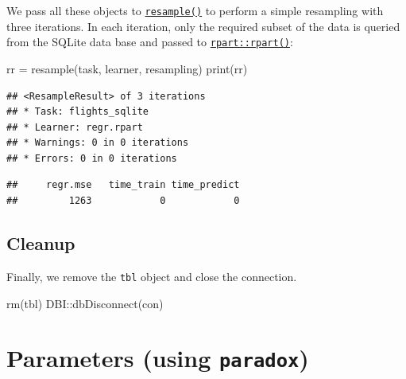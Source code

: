 \documentclass[
]{scrbook}
\newenvironment{Shaded}{\begin{snugshade}}{\end{snugshade}}
\newcommand{\FunctionTok}[1]{\textcolor[rgb]{0.00,0.00,0.00}{#1}}
\newcommand{\NormalTok}[1]{#1}
\newcommand{\OtherTok}[1]{\textcolor[rgb]{0.56,0.35,0.01}{#1}}
\newcommand{\SpecialCharTok}[1]{\textcolor[rgb]{0.00,0.00,0.00}{#1}}
\renewenvironment{Shaded} {\begin{snugshade}\small} {\end{snugshade}}
\begin{document}
We pass all these objects to \href{https://mlr3.mlr-org.com/reference/resample.html}{\texttt{resample()}} to perform a simple resampling with three iterations.
In each iteration, only the required subset of the data is queried from the SQLite data base and passed to \href{https://www.rdocumentation.org/packages/rpart/topics/rpart}{\texttt{rpart::rpart()}}:

\begin{Shaded}
\begin{Highlighting}[]
\NormalTok{rr }\OtherTok{=} \FunctionTok{resample}\NormalTok{(task, learner, resampling)}
\FunctionTok{print}\NormalTok{(rr)}
\end{Highlighting}
\end{Shaded}

\begin{verbatim}
## <ResampleResult> of 3 iterations
## * Task: flights_sqlite
## * Learner: regr.rpart
## * Warnings: 0 in 0 iterations
## * Errors: 0 in 0 iterations
\end{verbatim}

\begin{Shaded}
\end{Shaded}

\begin{verbatim}
##     regr.mse   time_train time_predict 
##         1263            0            0
\end{verbatim}

\hypertarget{cleanup}{%
\subsection{Cleanup}\label{cleanup}}

Finally, we remove the \texttt{tbl} object and close the connection.

\begin{Shaded}
\begin{Highlighting}[]
\FunctionTok{rm}\NormalTok{(tbl)}
\NormalTok{DBI}\SpecialCharTok{::}\FunctionTok{dbDisconnect}\NormalTok{(con)}
\end{Highlighting}
\end{Shaded}

\hypertarget{paradox}{%
\section{\texorpdfstring{Parameters (using \texttt{paradox})}{Parameters (using paradox)}}\label{paradox}}
\end{document}
